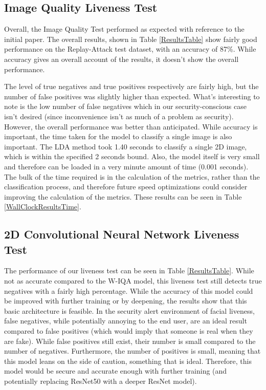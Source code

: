 \documentclass[12pt,a4paper]{article}
\begin{document}
    \subsection{Image Quality Liveness Test}
        Overall, the Image Quality Test performed as expected with reference to the initial paper.\cite{ImageQualityAssessmentTest}
        The overall results, shown in Table \ref{ResultsTable} show fairly good performance on the Replay-Attack test dataset, with an accuracy of 87\%. While accuracy gives an overall account of the results, it doesn't show the overall performance.
        
        The level of true negatives and true positives respectively are fairly high, but the number of false positives was slightly higher than expected.
        What's interesting to note is the low number of false negatives which in our security-conscious case isn't desired (since inconvenience isn't as much of a problem as security).
        However, the overall performance was better than anticipated.
        While accuracy is important, the time taken for the model to classify a single image is also important. The LDA method took 1.40 seconds to classify a single 2D image, which is within the specified 2 seconds bound.
        Also, the model itself is very small and therefore can be loaded in a very minute amount of time (0.001 seconds). The bulk of the time required is in the calculation of the metrics, rather than the classification process,
        and therefore future speed optimizations could consider improving the calculation of the metrics. These results can be seen in Table \ref{WallClockResultsTime}.

    \subsection{2D Convolutional Neural Network Liveness Test}

    The performance of our liveness test can be seen in Table \ref{ResultsTable}. While not as accurate compared to the W-IQA model, this liveness test still detects true negatives with a fairly high percentage.
    While the accuracy of this model could be improved with further training or by deepening, the results show that this basic architecture is feasible. In the security alert environment of facial liveness,
    false negatives, while potentially annoying to the end user, are an ideal result compared to false positives (which would imply that someone is real when they are fake). While false positives still exist, their number is small compared to the number of negatives.
    Furthermore, the number of positives is small, meaning that this model leans on the side of caution, something that is ideal. Therefore, this model would be secure and accurate enough with further training (and potentially replacing ResNet50 with a deeper ResNet model).
\end{document}

